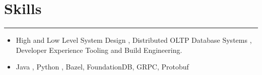 \section*{Skills}
\hrule
\vspace{0.3cm}
\begin{itemize}[label=\textperiodcentered,labelindent=0pt,itemindent=1em,leftmargin=0.3cm,itemsep=0pt]
    \item High and Low Level System Design , Distributed OLTP Database Systems , 
    Developer Experience Tooling and Build Engineering.
    \item Java , Python , Bazel, FoundationDB, GRPC, Protobuf
\end{itemize}
